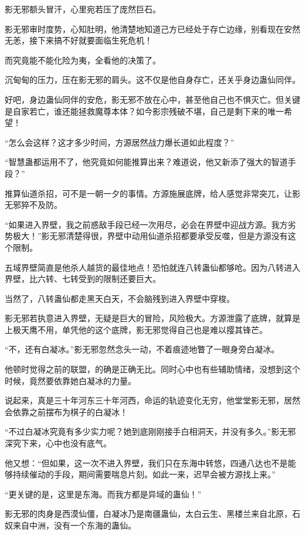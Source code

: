 \begin{this_body}
影无邪额头冒汗，心里宛若压了庞然巨石。

影无邪审时度势，心知肚明，他清楚地知道己方已经处于存亡边缘，别看现在安然无恙，接下来搞不好就要面临生死危机！

而究竟能不能化险为夷，全看他的决策了。

沉甸甸的压力，压在影无邪的肩头。这不仅是他自身存亡，还关乎身边蛊仙同伴。

好吧，身边蛊仙同伴的安危，影无邪不放在心中，甚至他自己也不惧灭亡。但关键是自家若亡，谁还能拯救魔尊本体？如今影宗残破不堪，自己是剩下来的唯一希望！

“怎么会这样？这才多少时间，方源居然战力爆长道如此程度？”

“智慧蛊都运用不了，他究竟如何能推算出来？难道说，他又新添了强大的智道手段？”

推算仙道杀招，可不是一朝一夕的事情。方源施展底牌，给人感觉非常突兀，让影无邪猝不及防。

“如果进入界壁，我之前惑敌手段已经一次用尽，必会在界壁中迎战方源。我方劣势极大！”影无邪清楚得很，界壁中动用仙道杀招都要承受反噬，但是方源没有这个限制。

五域界壁简直是他杀人越货的最佳地点！恐怕就连八转蛊仙都够呛。因为八转进入界壁，比六转、七转受到的限制还要巨大。

当然了，八转蛊仙都走黑天白天，不会脑残到进入界壁中穿梭。

影无邪若执意进入界壁，无疑是巨大的冒险，风险极大。方源泄露了底牌，就算是上极天鹰不用，单凭他的这个底牌，影无邪觉得自己也是难以撄其锋芒。

“不，还有白凝冰。”影无邪忽然念头一动，不着痕迹地瞥了一眼身旁白凝冰。

他顿时觉得之前的联盟，的确是正确无比。同时心中也有些辅助情绪，没想到这个时候，竟然要依靠她白凝冰的力量。

说起来，真是三十年河东三十年河西，命运的轨迹变化无穷，他堂堂影无邪，居然会依靠之前摆布为棋子的白凝冰！

“不过白凝冰究竟有多少实力呢？她到底刚刚接手白相洞天，并没有多久。”影无邪深究下来，心中也没有底气。

他又想：“但如果，这一次不进入界壁，我们只在东海中转悠，四通八达也不是能够持续催动的手段，期间需要喘息片刻。如此一来，迟早会被方源找上来。”

“更关键的是，这里是东海。而我方都是异域的蛊仙！”

影无邪的肉身是西漠仙僵，白凝冰乃是南疆蛊仙，太白云生、黑楼兰来自北原，石奴来自中洲，没有一个东海的蛊仙。


\end{this_body}
